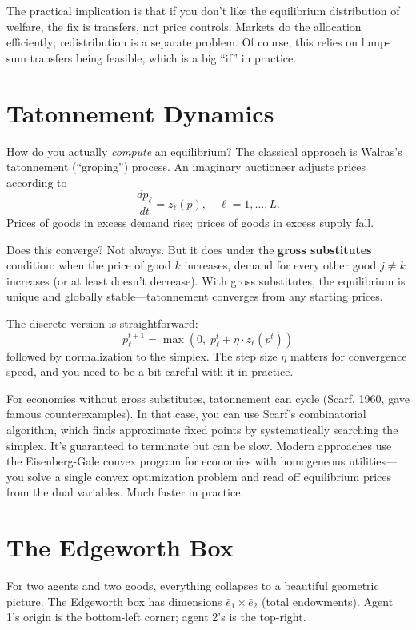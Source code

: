 \documentclass[11pt]{article}
\begin{document}
The practical implication is that if you don't like the equilibrium distribution of welfare, the fix is transfers, not price controls. Markets do the allocation efficiently; redistribution is a separate problem. Of course, this relies on lump-sum transfers being feasible, which is a big ``if'' in practice.

\section{Tatonnement Dynamics}

How do you actually \emph{compute} an equilibrium? The classical approach is Walras's tatonnement (``groping'') process. An imaginary auctioneer adjusts prices according to
\[
\frac{dp_\ell}{dt} = z_\ell(p), \quad \ell = 1, \ldots, L.
\]
Prices of goods in excess demand rise; prices of goods in excess supply fall.

Does this converge? Not always. But it does under the \textbf{gross substitutes} condition: when the price of good $k$ increases, demand for every other good $j \neq k$ increases (or at least doesn't decrease). With gross substitutes, the equilibrium is unique and globally stable---tatonnement converges from any starting prices.

The discrete version is straightforward:
\[
p_\ell^{t+1} = \max\left(0, \; p_\ell^t + \eta \cdot z_\ell(p^t)\right)
\]
followed by normalization to the simplex. The step size $\eta$ matters for convergence speed, and you need to be a bit careful with it in practice.

For economies without gross substitutes, tatonnement can cycle (Scarf, 1960, gave famous counterexamples). In that case, you can use Scarf's combinatorial algorithm, which finds approximate fixed points by systematically searching the simplex. It's guaranteed to terminate but can be slow. Modern approaches use the Eisenberg-Gale convex program for economies with homogeneous utilities---you solve a single convex optimization problem and read off equilibrium prices from the dual variables. Much faster in practice.

\section{The Edgeworth Box}

For two agents and two goods, everything collapses to a beautiful geometric picture. The Edgeworth box has dimensions $\bar{e}_1 \times \bar{e}_2$ (total endowments). Agent 1's origin is the bottom-left corner; agent 2's is the top-right.
\end{document}
